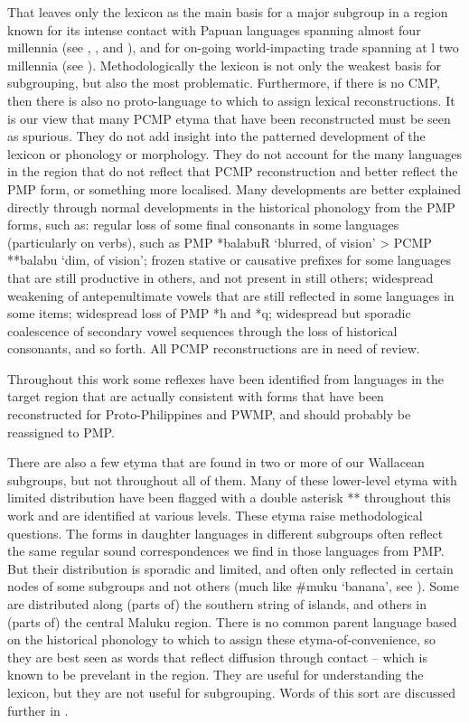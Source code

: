 \newpage
\largerpage
That leaves only the lexicon as the main basis for a major subgroup
in a region known for its intense contact with Papuan languages
spanning almost four millennia (see , , and ),
and for on-going world-impacting trade spanning
at l two millennia (see ).
Methodologically the lexicon is not only the weakest basis for
subgrouping, but also the most problematic.
Furthermore, if there is no CMP,
then there is also no proto-language to which to assign lexical reconstructions.
It is our view that many PCMP etyma that have been reconstructed
must be seen as spurious.
They do not add insight into the patterned development of the
lexicon or phonology or morphology.
They do not account for the many languages in the region that
do not reflect that PCMP reconstruction
and better reflect the PMP form,
or something more localised.
Many developments are better explained directly through normal
developments in the historical phonology from the PMP forms,
such as: regular loss of some final consonants in some languages
(particularly on verbs), such as PMP *balabuR ‘blurred,
of vision’ > PCMP **balabu ‘dim,
of vision’; frozen stative or causative prefixes for some languages
that are still productive in others,
and not present in still others; widespread weakening of antepenultimate
vowels that are still reflected in some languages in some items;
widespread loss of PMP *h
and *q; widespread but sporadic coalescence of secondary vowel
sequences through the loss of historical consonants, and so forth.
All PCMP reconstructions are in need of review.

Throughout this work some reflexes have been identified from
languages in the target region that are actually consistent with
forms that have been reconstructed for Proto-Philippines
and PWMP, and should probably be reassigned to PMP.

There are also a few etyma that are found in two or more of our
Wallacean subgroups, but not throughout all of them.
Many of these lower-level etyma with limited distribution have
been flagged with a double asterisk ** throughout this work
and are identified at various levels.
These etyma raise methodological questions.
The forms in daughter languages in different subgroups often
reflect the same regular sound correspondences we find in those languages from PMP.
But their distribution is sporadic
and limited, and often only reflected in certain nodes of some
subgroups and not others (much like {\#}muku ‘banana’, see ).
Some are distributed along (parts of) the southern string of
islands, and others in (parts of) the central Maluku region.
There is no common parent language based on the historical phonology
to which to assign these etyma-of-convenience,
so they are best seen as words that reflect diffusion through
contact -- which is known to be prevelant in the region.
They are useful for understanding the lexicon,
but they are not useful for subgrouping.
Words of this sort are discussed further in .